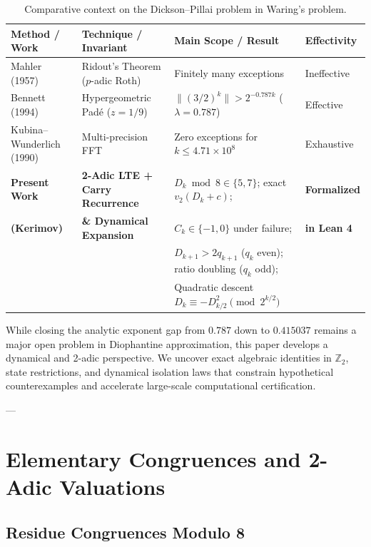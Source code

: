 \documentclass[11pt,reqno]{amsart}
\theoremstyle{definition}
\numberwithin{equation}{section}
\begin{document}
\begin{table}[htbp]
\centering
\small
\begin{tabular}{>{\raggedright\arraybackslash}p{}>{\raggedright\arraybackslash}p{}>{\raggedright\arraybackslash}p{}>{\raggedright\arraybackslash}p{}}
\toprule
\textbf{Method / Work} & \textbf{Technique / Invariant} & \textbf{Main Scope / Result} & \textbf{Effectivity} \\
\midrule
Mahler (1957) \cite{mahler1957} & Ridout's Theorem ($p$-adic Roth) & Finitely many exceptions & Ineffective \\
\addlinespace[2pt]
Bennett (1994) \cite{bennett1994} & Hypergeometric Padé ($z = 1/9$) & $\|(3/2)^k\| > 2^{-0.787 k}$ ($\lambda = 0.787$) & Effective \\
\addlinespace[2pt]
Kubina--Wunderlich (1990) \cite{kubina1990} & Multi-precision FFT & Zero exceptions for $k \le 4.71 \times 10^8$ & Exhaustive \\
\midrule
\textbf{Present Work} & \textbf{2-Adic LTE + Carry Recurrence} & $D_k \bmod 8 \in \{5, 7\}$; exact $v_2(D_k+c)$; & \textbf{Formalized} \\
\textbf{(Kerimov)} & \textbf{\& Dynamical Expansion} & $C_k \in \{-1, 0\}$ under failure; & \textbf{in Lean 4} \\
 & & $D_{k+1} > 2 q_{k+1}$ ($q_k$ even); ratio doubling ($q_k$ odd); & \\
 & & Quadratic descent $D_k \equiv -D_{k/2}^2 \pmod{2^{k/2}}$ & \\
\bottomrule
\end{tabular}
\caption{Comparative context on the Dickson--Pillai problem in Waring's problem.}\label{tab:comparison}
\end{table}

While closing the analytic exponent gap from $0.787$ down to $0.415037$ remains a major open problem in Diophantine approximation, this paper develops a dynamical and 2-adic perspective. We uncover exact algebraic identities in $\mathbb{Z}_2$, state restrictions, and dynamical isolation laws that constrain hypothetical counterexamples and accelerate large-scale computational certification.

---

\section{Elementary Congruences and 2-Adic Valuations}

\subsection{Residue Congruences Modulo 8}
\end{document}
